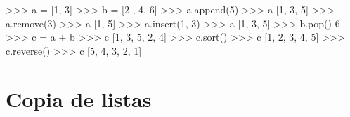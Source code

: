 \documentclass[
  spanish,
  a4paper,
]{scrreport}
\newenvironment{Shaded}{\begin{snugshade}}{\end{snugshade}}
\newcommand{\DecValTok}[1]{\textcolor[rgb]{0.68,0.00,0.00}{#1}}
\newcommand{\NormalTok}[1]{\textcolor[rgb]{0.00,0.23,0.31}{#1}}
\newcommand{\OperatorTok}[1]{\textcolor[rgb]{0.37,0.37,0.37}{#1}}
\begin{document}
\begin{Shaded}
\begin{Highlighting}[]
\OperatorTok{\textgreater{}\textgreater{}\textgreater{}}\NormalTok{ a }\OperatorTok{=}\NormalTok{ [}\DecValTok{1}\NormalTok{, }\DecValTok{3}\NormalTok{]}
\OperatorTok{\textgreater{}\textgreater{}\textgreater{}}\NormalTok{ b }\OperatorTok{=}\NormalTok{ [}\DecValTok{2}\NormalTok{ , }\DecValTok{4}\NormalTok{, }\DecValTok{6}\NormalTok{]}
\OperatorTok{\textgreater{}\textgreater{}\textgreater{}}\NormalTok{ a.append(}\DecValTok{5}\NormalTok{)}
\OperatorTok{\textgreater{}\textgreater{}\textgreater{}}\NormalTok{ a}
\NormalTok{[}\DecValTok{1}\NormalTok{, }\DecValTok{3}\NormalTok{, }\DecValTok{5}\NormalTok{]}
\OperatorTok{\textgreater{}\textgreater{}\textgreater{}}\NormalTok{ a.remove(}\DecValTok{3}\NormalTok{)}
\OperatorTok{\textgreater{}\textgreater{}\textgreater{}}\NormalTok{ a}
\NormalTok{[}\DecValTok{1}\NormalTok{, }\DecValTok{5}\NormalTok{]}
\OperatorTok{\textgreater{}\textgreater{}\textgreater{}}\NormalTok{ a.insert(}\DecValTok{1}\NormalTok{, }\DecValTok{3}\NormalTok{)}
\OperatorTok{\textgreater{}\textgreater{}\textgreater{}}\NormalTok{ a}
\NormalTok{[}\DecValTok{1}\NormalTok{, }\DecValTok{3}\NormalTok{, }\DecValTok{5}\NormalTok{]}
\OperatorTok{\textgreater{}\textgreater{}\textgreater{}}\NormalTok{ b.pop()}
\DecValTok{6}
\OperatorTok{\textgreater{}\textgreater{}\textgreater{}}\NormalTok{ c }\OperatorTok{=}\NormalTok{ a }\OperatorTok{+}\NormalTok{ b}
\OperatorTok{\textgreater{}\textgreater{}\textgreater{}}\NormalTok{ c}
\NormalTok{[}\DecValTok{1}\NormalTok{, }\DecValTok{3}\NormalTok{, }\DecValTok{5}\NormalTok{, }\DecValTok{2}\NormalTok{, }\DecValTok{4}\NormalTok{]}
\OperatorTok{\textgreater{}\textgreater{}\textgreater{}}\NormalTok{ c.sort()}
\OperatorTok{\textgreater{}\textgreater{}\textgreater{}}\NormalTok{ c}
\NormalTok{[}\DecValTok{1}\NormalTok{, }\DecValTok{2}\NormalTok{, }\DecValTok{3}\NormalTok{, }\DecValTok{4}\NormalTok{, }\DecValTok{5}\NormalTok{]}
\OperatorTok{\textgreater{}\textgreater{}\textgreater{}}\NormalTok{ c.reverse()}
\OperatorTok{\textgreater{}\textgreater{}\textgreater{}}\NormalTok{ c}
\NormalTok{[}\DecValTok{5}\NormalTok{, }\DecValTok{4}\NormalTok{, }\DecValTok{3}\NormalTok{, }\DecValTok{2}\NormalTok{, }\DecValTok{1}\NormalTok{]}
\end{Highlighting}
\end{Shaded}

\section{Copia de listas}\label{copia-de-listas}
\end{document}
